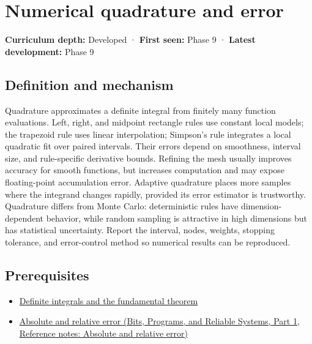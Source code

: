 \hypertarget{appendix-80521eae6b71}{}\label{referencestart:appendix-80521eae6b71}
\section{Numerical quadrature and error}\label{appendix-80521eae6b71-numerical-quadrature-and-error}

\hypertarget{appendix-80521eae6b71-numerical-quadrature-and-error}{}

\textbf{Curriculum depth:} Developed · \textbf{First seen:} Phase 9 · \textbf{Latest development:} Phase 9

\begin{allmightroledefinition}

\subsection{Definition and mechanism}\label{appendix-80521eae6b71-definition-and-mechanism}

\hypertarget{appendix-80521eae6b71-definition-and-mechanism}{}

Quadrature approximates a definite integral from finitely many function evaluations. Left, right, and midpoint rectangle rules use constant local models; the trapezoid rule uses linear interpolation; Simpson's rule integrates a local quadratic fit over paired intervals. Their errors depend on smoothness, interval size, and rule-specific derivative bounds. Refining the mesh usually improves accuracy for smooth functions, but increases computation and may expose floating-point accumulation error. Adaptive quadrature places more samples where the integrand changes rapidly, provided its error estimator is trustworthy. Quadrature differs from Monte Carlo: deterministic rules have dimension-dependent behavior, while random sampling is attractive in high dimensions but has statistical uncertainty. Report the interval, nodes, weights, stopping tolerance, and error-control method so numerical results can be reproduced.

\end{allmightroledefinition}

\subsection{Prerequisites}\label{appendix-80521eae6b71-prerequisites}

\hypertarget{appendix-80521eae6b71-prerequisites}{}

\begin{itemize}
\tightlist
\item
  \hyperref[appendix-1a50e72435c2]{Definite integrals and the fundamental theorem}
\item
  \href{../01-Bits-Programs-and-Reliable-Systems-P01/main.pdf\#nameddest=appendix-3ae74e89b4e6}{Absolute and relative error (Bits, Programs, and Reliable Systems, Part 1, Reference notes: Absolute and relative error)}
\end{itemize}

